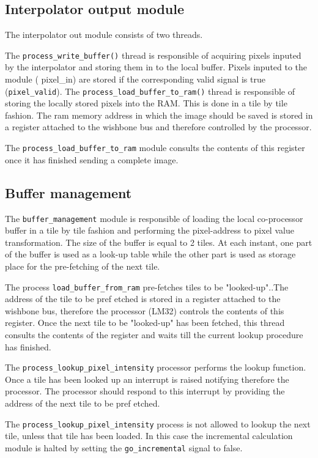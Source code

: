 \subsection{Interpolator output module}
The interpolator out module consists of two threads. 

The \texttt{process\_write\_buffer()} thread is responsible of acquiring pixels inputed by the interpolator and storing them in to the local buffer. Pixels inputed to the module ( pixel\_in) are stored if the corresponding valid signal is true (\texttt{pixel\_valid}). The \texttt{process\_load\_buffer\_to\_ram()} thread is responsible of storing the locally stored pixels into the RAM. This is done in a tile by tile fashion. The ram memory address in which the image should be saved is stored in a register attached to the wishbone bus and therefore controlled by the processor. 

The \texttt{process\_load\_buffer\_to\_ram} module consults the contents of this register once it has finished sending a complete image.

\subsection{Buffer management}

The \texttt{buffer\_management} module is responsible of loading the local co-processor buffer in a tile by tile fashion and performing the pixel-address to pixel value transformation. The size of the buffer is equal to 2 tiles. At each instant, one part of the buffer is used as a look-up table while the other part is used as storage place for the pre-fetching of the next tile. 

The process \texttt{load\_buffer\_from\_ram} pre-fetches tiles  to be "looked-up"..The address of the tile to be pref etched is stored in a register attached to the wishbone bus, therefore the processor (LM32) controls the contents of this register. Once the next tile to be "looked-up" has been fetched, this thread consults the contents of the register and waits till the current  lookup procedure has finished. 

The  \texttt{process\_lookup\_pixel\_intensity}  processor performs the lookup function. Once a tile has been looked up an interrupt is raised notifying therefore the processor. The processor should respond to this interrupt by providing the address of the next tile to be pref etched. 

The \texttt{process\_lookup\_pixel\_intensity} process is not allowed to lookup the next tile, unless that tile has been loaded. In this case the incremental calculation module is halted by setting the \texttt{go\_incremental} signal to false.  
